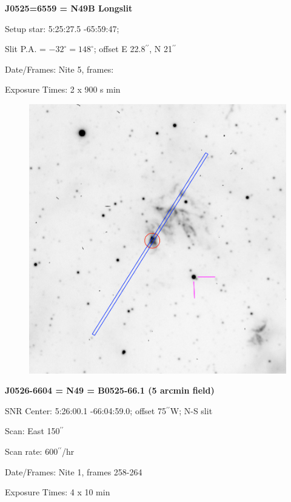 \documentclass[11pt]{article}
\newcommand{\arcsec}{$^{\prime\prime}$}
\begin{document}
\newpage
{\bf J0525=6559 = N49B Longslit}  
 
Setup star:   5:25:27.5  -65:59:47;

Slit P.A. = $-32^\circ = 148^\circ$;     offset E 22.8\arcsec,  N 21\arcsec   

Date/Frames:  Nite 5, frames: 

Exposure Times:  2 x 900 s min

\begin{figure}
\includegraphics[width=12.5cm]{snapshots/N49B_longslit.png}
\end{figure}


\newpage
{\bf J0526-6604 = N49 = B0525-66.1 (5 arcmin field)}  
 
SNR Center:   5:26:00.1   -66:04:59.0;  offset 75\arcsec W;      N-S slit

Scan:  East   150\arcsec

Scan rate:    600\arcsec/hr

Date/Frames:  Nite 1, frames 258-264

Exposure Times:  4 x 10 min
\end{document}
